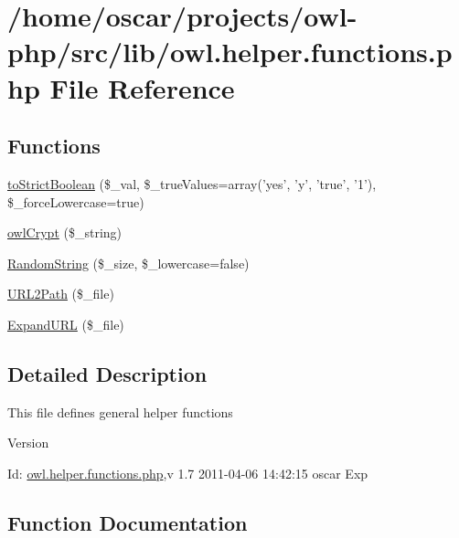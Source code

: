 \section{/home/oscar/projects/owl-\/php/src/lib/owl.helper.functions.php File Reference}
\label{owl_8helper_8functions_8php}
\subsection*{Functions}
\begin{DoxyCompactItemize}
\item 
\hyperlink{owl_8helper_8functions_8php_a2c49978306cd0e2f4f9406c20373ed02}{toStrictBoolean} (\$\_\-val, \$\_\-trueValues=array('yes', 'y', 'true', '1'), \$\_\-forceLowercase=true)
\item 
\hyperlink{owl_8helper_8functions_8php_a0836b830fe9e399265d4cf910c5dff28}{owlCrypt} (\$\_\-string)
\item 
\hyperlink{owl_8helper_8functions_8php_a91f5481c5ca87b74848c1966639d490c}{RandomString} (\$\_\-size, \$\_\-lowercase=false)
\item 
\hyperlink{owl_8helper_8functions_8php_a0eb759657249228d1a2473ffa7de921c}{URL2Path} (\$\_\-file)
\item 
\hyperlink{owl_8helper_8functions_8php_a08f49d79aaaa581551e49017424cbe77}{ExpandURL} (\$\_\-file)
\end{DoxyCompactItemize}


\subsection{Detailed Description}
This file defines general helper functions \begin{DoxyVersion}{Version}

\end{DoxyVersion}
\begin{DoxyParagraph}{Id:}
\hyperlink{owl_8helper_8functions_8php}{owl.helper.functions.php},v 1.7 2011-\/04-\/06 14:42:15 oscar Exp 
\end{DoxyParagraph}


\subsection{Function Documentation}
